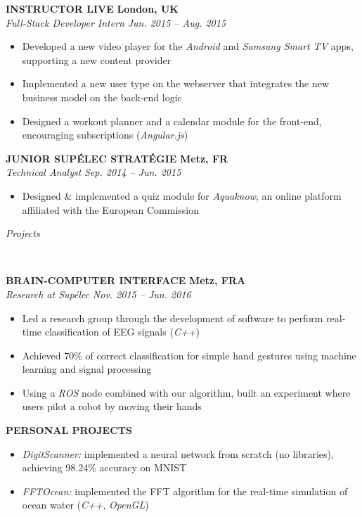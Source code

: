 \documentclass[a4paper, 12pt]{article}
\newcommand{\marginline}{-0.3cm}
\newcommand{\margincontent}{-0.6cm}
\newcommand{\marginbeforesection}{0.25cm}
\newcommand{\linewidthperso}{0.02cm}
\newcommand{\styletitle}[1]{\textbf{#1}}
\newcommand{\styledesc}[1]{\textit{#1}}
\newcommand{\styleloc}[1]{\textbf{#1}}
\newcommand{\styledates}[1]{\textit{#1}}
\newcommand{\stylesection}[1]{
  \vspace{\marginbeforesection}
  \begin{normalsize}\textit{#1}\end{normalsize}
  \vspace{\marginline}\\
  \noindent\makebox[\linewidth]{\rule{\textwidth}{\linewidthperso}}

}
\begin{document}
\begin{footnotesize}
\styletitle{INSTRUCTOR LIVE} \hfill \styleloc{London, UK}\\
\styledesc{Full-Stack Developer Intern} \hfill \styledates{Jun. 2015 -- Aug. 2015}\\
\vspace{\margincontent}
\begin{itemize}
  \item Developed a new video player for the \textit{Android} and \textit{Samsung Smart TV} apps, supporting a new content provider
  \item Implemented a new user type on the webserver that integrates the new business model on the back-end logic
  \item Designed a workout planner and a calendar module for the front-end, encouraging subscriptions (\textit{Angular.js})
\end{itemize}

\styletitle{JUNIOR SUP\'ELEC STRAT\'EGIE} \hfill \styleloc{Metz, FR}\\
\styledesc{Technical Analyst} \hfill \styledates{Sep. 2014 -- Jun. 2015}\\
\vspace{\margincontent}
\begin{itemize}
  \item Designed \& implemented a quiz module for \textit{Aquaknow}, an online platform affiliated with the European Commission
\end{itemize}

\stylesection{Projects}
   
\styletitle{BRAIN-COMPUTER INTERFACE} \hfill \styleloc{Metz, FRA}\\
\styledesc{Research at Sup\'elec} \hfill \styledates{Nov. 2015 -- Jun. 2016}\\
\vspace{\margincontent}
\begin{itemize}
  \item Led a research group through the development of software to perform real-time classification of EEG signals (\textit{C++}) 
  \item Achieved 70\% of correct classification for simple hand gestures using machine learning and signal processing
  \item Using a \textit{ROS} node combined with our algorithm, built an experiment where users pilot a robot by moving their hands 
\end{itemize}

\styletitle{PERSONAL PROJECTS}\\
\vspace{\margincontent}
\begin{itemize}
  \item \textit{DigitScanner:} implemented a neural network from scratch (no libraries), achieving 98.24\% accuracy on MNIST
  \item \textit{FFTOcean:} implemented the FFT algorithm for the real-time simulation of ocean water (\textit{C++}, \textit{OpenGL})
\end{itemize}


\end{footnotesize}
\end{document}
